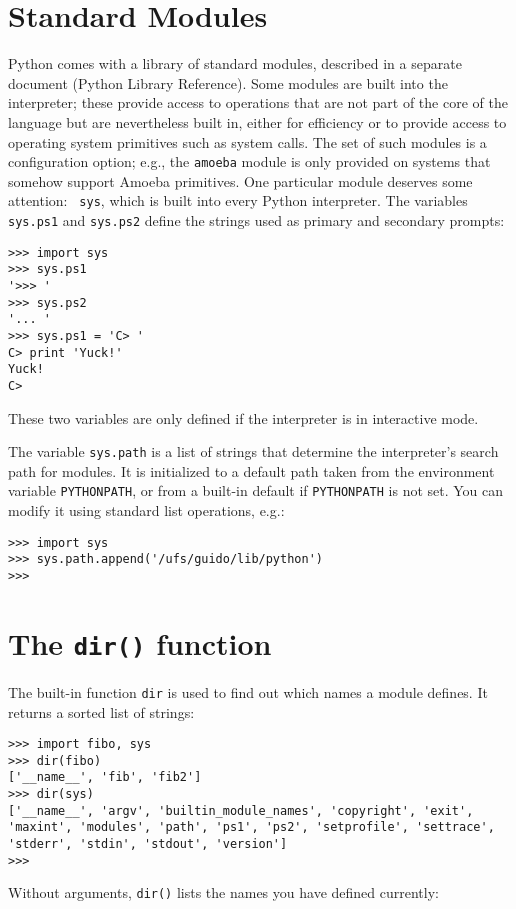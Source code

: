 \section{Standard Modules}

Python comes with a library of standard modules, described in a separate
document (Python Library Reference).  Some modules are built into the
interpreter; these provide access to operations that are not part of the
core of the language but are nevertheless built in, either for
efficiency or to provide access to operating system primitives such as
system calls.  The set of such modules is a configuration option; e.g.,
the {\tt amoeba} module is only provided on systems that somehow support
Amoeba primitives.  One particular module deserves some attention: {\tt
sys}, which is built into every Python interpreter.  The variables {\tt
sys.ps1} and {\tt sys.ps2} define the strings used as primary and
secondary prompts:

\bcode\begin{verbatim}
>>> import sys
>>> sys.ps1
'>>> '
>>> sys.ps2
'... '
>>> sys.ps1 = 'C> '
C> print 'Yuck!'
Yuck!
C> 
\end{verbatim}\ecode
%
These two variables are only defined if the interpreter is in
interactive mode.

The variable
{\tt sys.path}
is a list of strings that determine the interpreter's search path for
modules.
It is initialized to a default path taken from the environment variable
{\tt PYTHONPATH},
or from a built-in default if
{\tt PYTHONPATH}
is not set.
You can modify it using standard list operations, e.g.:

\bcode\begin{verbatim}
>>> import sys
>>> sys.path.append('/ufs/guido/lib/python')
>>> 
\end{verbatim}\ecode

\section{The {\tt dir()} function}

The built-in function {\tt dir} is used to find out which names a module
defines.  It returns a sorted list of strings:

\bcode\begin{verbatim}
>>> import fibo, sys
>>> dir(fibo)
['__name__', 'fib', 'fib2']
>>> dir(sys)
['__name__', 'argv', 'builtin_module_names', 'copyright', 'exit',
'maxint', 'modules', 'path', 'ps1', 'ps2', 'setprofile', 'settrace',
'stderr', 'stdin', 'stdout', 'version']
>>>
\end{verbatim}\ecode
%
Without arguments, {\tt dir()} lists the names you have defined currently:

